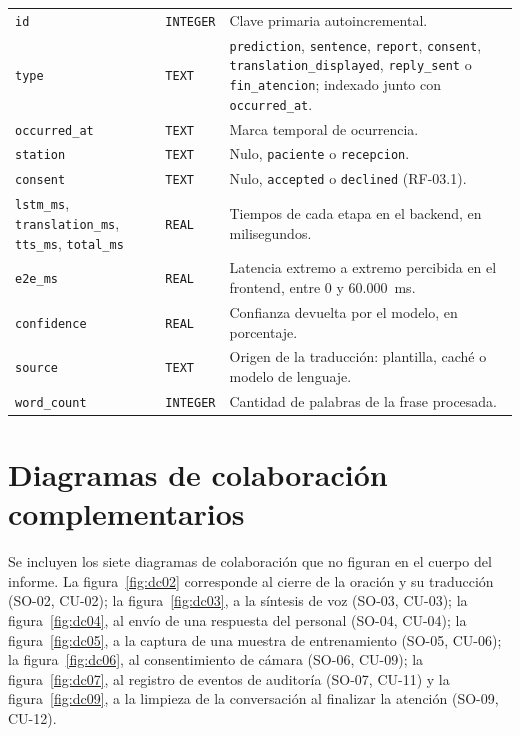 \begin{longtable}{>{\raggedright\arraybackslash}p{3.8cm} >{\raggedright\arraybackslash}p{2.9cm} >{\raggedright\arraybackslash}p{7.9cm}}
  \texttt{id} & \texttt{INTEGER} & Clave primaria autoincremental. \\
  \texttt{type} & \texttt{TEXT} & \texttt{prediction}, \texttt{sentence}, \texttt{report}, \texttt{consent}, \texttt{translation\_displayed}, \texttt{reply\_sent} o \texttt{fin\_atencion}; indexado junto con \texttt{occurred\_at}. \\
  \texttt{occurred\_at} & \texttt{TEXT} & Marca temporal de ocurrencia. \\
  \texttt{station} & \texttt{TEXT} & Nulo, \texttt{paciente} o \texttt{recepcion}. \\
  \texttt{consent} & \texttt{TEXT} & Nulo, \texttt{accepted} o \texttt{declined} (RF-03.1). \\
  \texttt{lstm\_ms}, \texttt{translation\_ms}, \texttt{tts\_ms}, \texttt{total\_ms} & \texttt{REAL} & Tiempos de cada etapa en el backend, en milisegundos. \\
  \texttt{e2e\_ms} & \texttt{REAL} & Latencia extremo a extremo percibida en el frontend, entre 0 y 60.000~ms. \\
  \texttt{confidence} & \texttt{REAL} & Confianza devuelta por el modelo, en porcentaje. \\
  \texttt{source} & \texttt{TEXT} & Origen de la traducción: plantilla, caché o modelo de lenguaje. \\
  \texttt{word\_count} & \texttt{INTEGER} & Cantidad de palabras de la frase procesada. \\
  \bottomrule
\end{longtable}

\section{Diagramas de colaboración complementarios}\label{anx:colaboracion}

Se incluyen los siete diagramas de colaboración que no figuran en el cuerpo del informe. La figura~\ref{fig:dc02} corresponde al cierre de la oración y su traducción (SO-02, CU-02); la figura~\ref{fig:dc03}, a la síntesis de voz (SO-03, CU-03); la figura~\ref{fig:dc04}, al envío de una respuesta del personal (SO-04, CU-04); la figura~\ref{fig:dc05}, a la captura de una muestra de entrenamiento (SO-05, CU-06); la figura~\ref{fig:dc06}, al consentimiento de cámara (SO-06, CU-09); la figura~\ref{fig:dc07}, al registro de eventos de auditoría (SO-07, CU-11) y la figura~\ref{fig:dc09}, a la limpieza de la conversación al finalizar la atención (SO-09, CU-12).

